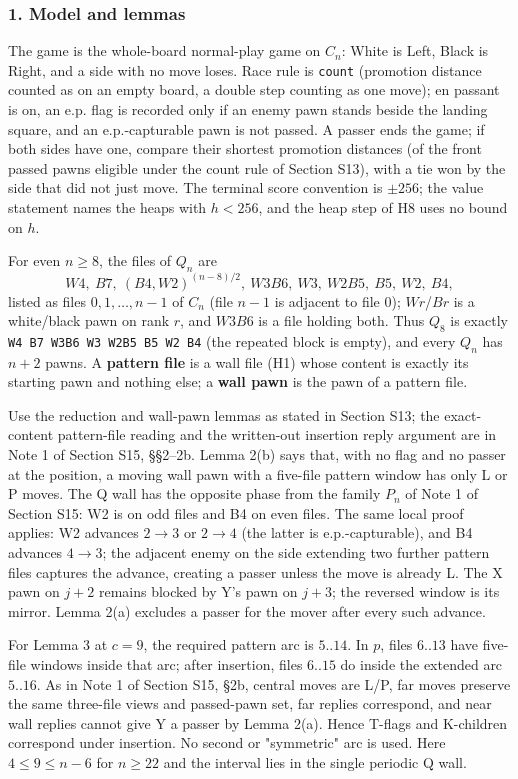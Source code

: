 \subsubsection*{1. Model and lemmas}
The game is the whole-board normal-play game on $C_n$: White is Left, Black is Right, and a side with no move loses. Race rule is \texttt{count} (promotion distance counted as on an empty board, a double step counting as one move); en passant is on, an e.p. flag is recorded only if an enemy pawn stands beside the landing square, and an e.p.-capturable pawn is not passed. A passer ends the game; if both sides have one, compare their shortest promotion distances (of the front passed pawns eligible under the count rule of Section S13), with a tie won by the side that did not just move. The terminal score convention is $\pm256$; the value statement names the heaps with $h<256$, and the heap step of H8 uses no bound on $h$.

For even $n\ge8$, the files of $Q_n$ are \[ W4,\ B7,\ (B4,W2)^{(n-8)/2},\ W3B6,\ W3,\ W2B5,\ B5,\ W2,\ B4, \] listed as files $0,1,\dots,n-1$ of $C_n$ (file $n-1$ is adjacent to file 0); $Wr$/$Br$ is a white/black pawn on rank $r$, and $W3B6$ is a file holding both. Thus $Q_8$ is exactly \texttt{W4 B7 W3B6 W3 W2B5 B5 W2 B4} (the repeated block is empty), and every $Q_n$ has $n+2$ pawns. A \textbf{pattern file} is a wall file (H1) whose content is exactly its starting pawn and nothing else; a \textbf{wall pawn} is the pawn of a pattern file.

Use the reduction and wall-pawn lemmas as stated in Section S13; the exact-content pattern-file reading and the written-out insertion reply argument are in Note 1 of Section S15, §§2–2b. Lemma 2(b) says that, with no flag and no passer at the position, a moving wall pawn with a five-file pattern window has only L or P moves. The Q wall has the opposite phase from the family $P_n$ of Note 1 of Section S15: W2 is on odd files and B4 on even files. The same local proof applies: W2 advances $2\to3$ or $2\to4$ (the latter is e.p.-capturable), and B4 advances $4\to3$; the adjacent enemy on the side extending two further pattern files captures the advance, creating a passer unless the move is already L. The X pawn on $j+2$ remains blocked by Y's pawn on $j+3$; the reversed window is its mirror. Lemma 2(a) excludes a passer for the mover after every such advance.

For Lemma 3 at $c=9$, the required pattern arc is $5..14$. In $p$, files $6..13$ have five-file windows inside that arc; after insertion, files $6..15$ do inside the extended arc $5..16$. As in Note 1 of Section S15, §2b, central moves are L/P, far moves preserve the same three-file views and passed-pawn set, far replies correspond, and near wall replies cannot give Y a passer by Lemma 2(a). Hence T-flags and K-children correspond under insertion. No second or "symmetric" arc is used. Here $4\le 9\le n-6$ for $n\ge22$ and the interval lies in the single periodic Q wall.

